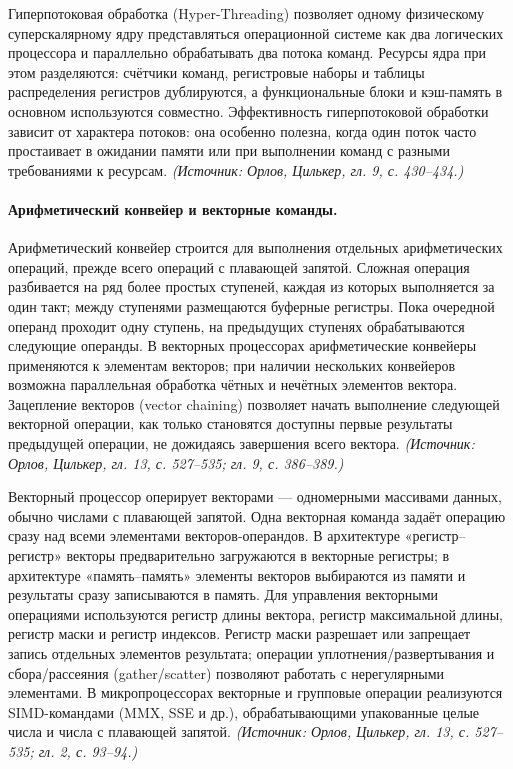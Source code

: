 \documentclass[a4paper,12pt]{article}
\begin{document}
Гиперпотоковая обработка (Hyper-Threading) позволяет одному физическому суперскалярному ядру представляться операционной системе как два логических процессора и параллельно обрабатывать два потока команд. Ресурсы ядра при этом разделяются: счётчики команд, регистровые наборы и таблицы распределения регистров дублируются, а функциональные блоки и кэш-память в основном используются совместно. Эффективность гиперпотоковой обработки зависит от характера потоков: она особенно полезна, когда один поток часто простаивает в ожидании памяти или при выполнении команд с разными требованиями к ресурсам.
\textit{(Источник: Орлов, Цилькер, гл. 9, с. 430--434.)}

\paragraph{Арифметический конвейер и векторные команды.}
Арифметический конвейер строится для выполнения отдельных арифметических операций, прежде всего операций с плавающей запятой. Сложная операция разбивается на ряд более простых ступеней, каждая из которых выполняется за один такт; между ступенями размещаются буферные регистры. Пока очередной операнд проходит одну ступень, на предыдущих ступенях обрабатываются следующие операнды. В векторных процессорах арифметические конвейеры применяются к элементам векторов; при наличии нескольких конвейеров возможна параллельная обработка чётных и нечётных элементов вектора. Зацепление векторов (vector chaining) позволяет начать выполнение следующей векторной операции, как только становятся доступны первые результаты предыдущей операции, не дожидаясь завершения всего вектора.
\textit{(Источник: Орлов, Цилькер, гл. 13, с. 527--535; гл. 9, с. 386--389.)}

Векторный процессор оперирует векторами --- одномерными массивами данных, обычно числами с плавающей запятой. Одна векторная команда задаёт операцию сразу над всеми элементами векторов-операндов. В архитектуре «регистр--регистр» векторы предварительно загружаются в векторные регистры; в архитектуре «память--память» элементы векторов выбираются из памяти и результаты сразу записываются в память. Для управления векторными операциями используются регистр длины вектора, регистр максимальной длины, регистр маски и регистр индексов. Регистр маски разрешает или запрещает запись отдельных элементов результата; операции уплотнения/развертывания и сбора/рассеяния (gather/scatter) позволяют работать с нерегулярными элементами. В микропроцессорах векторные и групповые операции реализуются SIMD-командами (MMX, SSE и др.), обрабатывающими упакованные целые числа и числа с плавающей запятой.
\textit{(Источник: Орлов, Цилькер, гл. 13, с. 527--535; гл. 2, с. 93--94.)}
\end{document}
